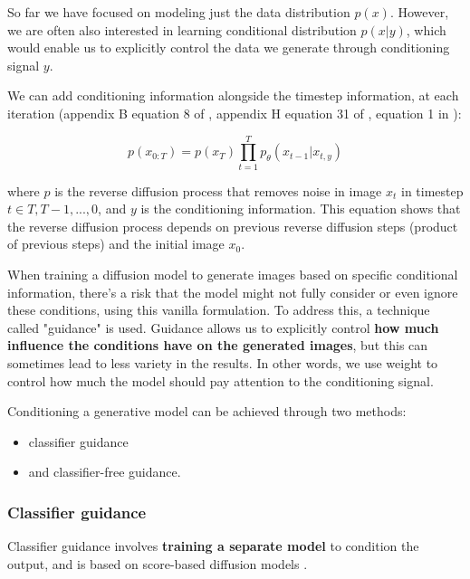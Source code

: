 So far we have focused on modeling just the data distribution $p(x)$. However, we are often also interested in learning conditional distribution $p(x|y)$, which would enable us to explicitly control the data we generate through conditioning signal $y$.

We can add conditioning information alongside the timestep information, at each iteration (appendix B equation 8 of \cite{ddpm}, appendix H equation 31 of \cite{openai_diffusion_beats_gans}, equation 1 in \cite{ddim}):

\[
p(x_{0:T}) = p(x_T) \prod_{t=1}^{T} p_\theta (x_{t-1} | x_{t, y})
\]

where $p$ is the reverse diffusion process that removes noise in image $x_t$ in timestep $t \in {T, T-1, ..., 0}$, and $y$ is the conditioning information. This equation shows that the reverse diffusion process depends on previous reverse diffusion steps (product of previous steps) and the initial image $x_0$.

When training a diffusion model to generate images based on specific conditional information, there's a risk that the model might not fully consider or even ignore these conditions, using this vanilla formulation. To address this, a technique called "guidance" is used. Guidance allows us to explicitly control \textbf{how much influence the conditions have on the generated images}, but this can sometimes lead to less variety in the results. In other words, we use weight to control how much the model should pay attention to the conditioning signal.


Conditioning a generative model can be achieved through two methods: 

\begin{itemize}
    \item classifier guidance
    \item and classifier-free guidance.
\end{itemize}





\subsubsection*{Classifier guidance}

Classifier guidance \cite{openai_diffusion_beats_gans} involves \textbf{training a separate model} to condition the output, and is based on score-based diffusion models \cite{score_based_generative_modeling}. 


